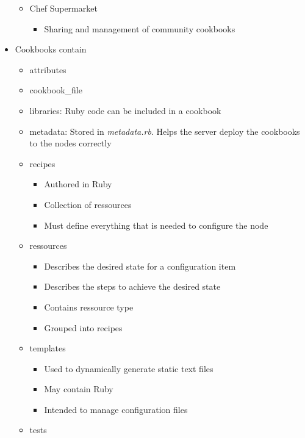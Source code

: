 \begin{itemize}
\begin{itemize}
\begin{itemize}
					\end{itemize}
				\item Chef Supermarket
				\begin{itemize}
					\item Sharing and management of community cookbooks
				\end{itemize}
			\end{itemize}
		\item Cookbooks contain
			\begin{itemize}
				\item attributes
				\item cookbook\_file
				\item libraries: Ruby code can be included in a cookbook
				\item metadata: Stored in \textit{metadata.rb}. Helps the server deploy the cookbooks to the nodes correctly
				\item recipes
					\begin{itemize}
						\item Authored in Ruby
						\item Collection of ressources
						\item Must define everything that is needed to configure the node
					\end{itemize}
				\item ressources
					\begin{itemize}
						\item Describes the desired state for a configuration item
						\item Describes the steps to achieve the desired state
						\item Contains ressource type
						\item Grouped into recipes
					\end{itemize}
				\item templates
					\begin{itemize}
						\item Used to dynamically generate static text files
						\item May contain Ruby
						\item Intended to manage configuration files
					\end{itemize}
				\item tests
			\end{itemize}
	\end{itemize}

